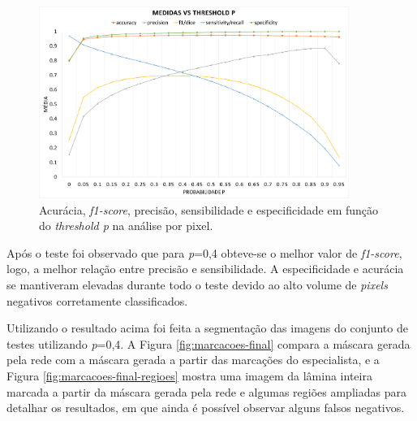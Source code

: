 \begin{figure}
    \center
\includegraphics[width=0.9\textwidth]{figures/4_results/compilado.png}
  
    \caption[Métricas obtidas na análise por pixel.]{Acurácia, \textit{f1-score}, precisão, sensibilidade e especificidade em função do \textit{threshold p} na análise por pixel.}
    \label{fig:graphic-results}
\end{figure}

Após o teste foi observado que para \textit{p}=0,4 obteve-se o melhor valor de \textit{f1-score}, logo, a melhor relação entre precisão e sensibilidade. A especificidade e acurácia se mantiveram elevadas durante todo o teste devido ao alto volume de \textit{pixels} negativos corretamente classificados.

Utilizando o resultado acima foi feita a segmentação das imagens do conjunto de testes utilizando \textit{p}=0,4. A Figura \ref{fig:marcacoes-final} compara a máscara gerada pela rede com a máscara gerada a partir das marcações do especialista, e a Figura \ref{fig:marcacoes-final-regioes} mostra uma imagem da lâmina inteira marcada a partir da máscara gerada pela rede e algumas regiões ampliadas para detalhar os resultados, em que ainda é possível observar alguns falsos negativos.

